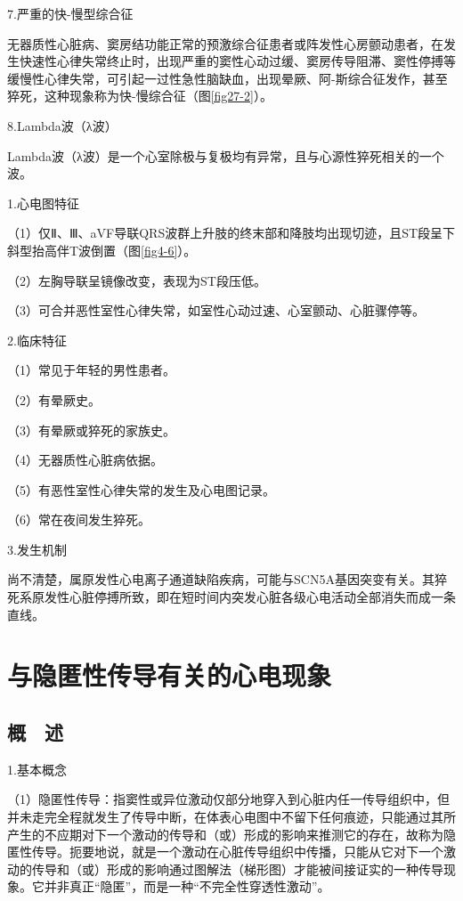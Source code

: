 7.严重的快-慢型综合征

无器质性心脏病、窦房结功能正常的预激综合征患者或阵发性心房颤动患者，在发生快速性心律失常终止时，出现严重的窦性心动过缓、窦房传导阻滞、窦性停搏等缓慢性心律失常，可引起一过性急性脑缺血，出现晕厥、阿-斯综合征发作，甚至猝死，这种现象称为快-慢综合征（图\ref{fig27-2}）。

8.Lambda波（λ波）

Lambda波（λ波）是一个心室除极与复极均有异常，且与心源性猝死相关的一个波。

1.心电图特征

（1）仅Ⅱ、Ⅲ、aVF导联QRS波群上升肢的终末部和降肢均出现切迹，且ST段呈下斜型抬高伴T波倒置（图\ref{fig4-6}）。

（2）左胸导联呈镜像改变，表现为ST段压低。

（3）可合并恶性室性心律失常，如室性心动过速、心室颤动、心脏骤停等。

2.临床特征

（1）常见于年轻的男性患者。

（2）有晕厥史。

（3）有晕厥或猝死的家族史。

（4）无器质性心脏病依据。

（5）有恶性室性心律失常的发生及心电图记录。

（6）常在夜间发生猝死。

3.发生机制

尚不清楚，属原发性心电离子通道缺陷疾病，可能与SCN5A基因突变有关。其猝死系原发性心脏停搏所致，即在短时间内突发心脏各级心电活动全部消失而成一条直线。

\protect\hypertarget{text00042.html}{}{}

\protect\hypertarget{text00042.htmlux5cux23chapter42}{}{}

\chapter{与隐匿性传导有关的心电现象}

\protect\hypertarget{text00042.htmlux5cux23subid452}{}{}

\section{概　述}

1.基本概念

（1）隐匿性传导：指窦性或异位激动仅部分地穿入到心脏内任一传导组织中，但并未走完全程就发生了传导中断，在体表心电图中不留下任何痕迹，只能通过其所产生的不应期对下一个激动的传导和（或）形成的影响来推测它的存在，故称为隐匿性传导。扼要地说，就是一个激动在心脏传导组织中传播，只能从它对下一个激动的传导和（或）形成的影响通过图解法（梯形图）才能被间接证实的一种传导现象。它并非真正“隐匿”，而是一种“不完全性穿透性激动”。

